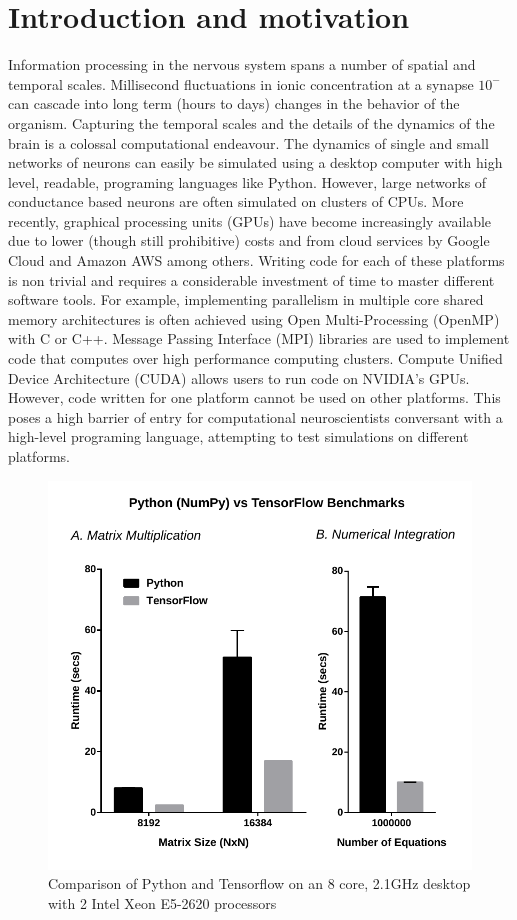 \documentclass[10pt,letterpaper]{article}
\begin{document}
\section*{Introduction and motivation}
Information processing in the nervous system spans a number of spatial and temporal scales. Millisecond fluctuations in ionic concentration at a synapse $10^-$ can cascade into long term (hours to days) changes in the behavior of the organism. Capturing the temporal scales and the details of the dynamics of the brain is a colossal computational endeavour. The dynamics of single and small networks of neurons can easily be simulated using a desktop computer with high level, readable, programing languages like Python. However, large networks of conductance based neurons are often simulated on clusters of CPUs. More recently, graphical processing units (GPUs) have become increasingly available due to lower (though still prohibitive) costs and from cloud services by Google Cloud and Amazon AWS among others. Writing code for each of these platforms is non trivial and requires a considerable investment of time to master different software tools. For example, implementing parallelism in multiple core shared memory architectures is often achieved using Open Multi-Processing (OpenMP) with C or C++. Message Passing Interface (MPI) libraries are used to implement code that computes over high performance computing clusters. Compute Unified Device Architecture (CUDA) allows users to run code on NVIDIA's GPUs. However, code written for one platform cannot be used on other platforms. This poses a high barrier of entry for computational neuroscientists conversant with a high-level programing language, attempting to test simulations on different platforms. 
\begin{figure}
\includegraphics[scale=0.7]{Figures/Bench.pdf} 
\caption{Comparison of Python and Tensorflow on an 8 core, 2.1GHz desktop with 2 Intel Xeon E5-2620 processors}
\label{fig:comparison}
\end{figure}
\end{document}
